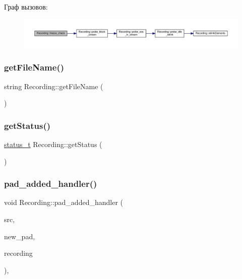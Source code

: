 Граф вызовов\+:\nopagebreak
\begin{figure}[H]
\begin{center}
\leavevmode
\includegraphics[width=350pt]{class_recording_aebc44e786341582a88b0d91889110c3c_cgraph}
\end{center}
\end{figure}
\mbox{\label{class_recording_a9c1a632374ab3887670ed1e9e18a5e50}} 
\subsubsection{\texorpdfstring{get\+File\+Name()}{getFileName()}}
{\footnotesize\ttfamily string Recording\+::get\+File\+Name (\begin{DoxyParamCaption}{ }\end{DoxyParamCaption})\hspace{0.3cm}{\ttfamily [inline]}}

\mbox{\label{class_recording_a611b49ac3f6935c312a7f3dc141d3db7}} 
\subsubsection{\texorpdfstring{get\+Status()}{getStatus()}}
{\footnotesize\ttfamily \hyperlink{recording_8h_af9bff8ff1154a04a899276af806b8586}{status\+\_\+t} Recording\+::get\+Status (\begin{DoxyParamCaption}{ }\end{DoxyParamCaption})\hspace{0.3cm}{\ttfamily [inline]}}

\mbox{\label{class_recording_abea9877130d33f18639df0544497d473}} 
\subsubsection{\texorpdfstring{pad\+\_\+added\+\_\+handler()}{pad\_added\_handler()}}
{\footnotesize\ttfamily void Recording\+::pad\+\_\+added\+\_\+handler (\begin{DoxyParamCaption}\item[{Gst\+Element $\ast$}]{src,  }\item[{Gst\+Pad $\ast$}]{new\+\_\+pad,  }\item[{\hyperlink{class_recording}{Recording} $\ast$}]{recording }\end{DoxyParamCaption})\hspace{0.3cm}{\ttfamily [static]}, {\ttfamily [private]}}

